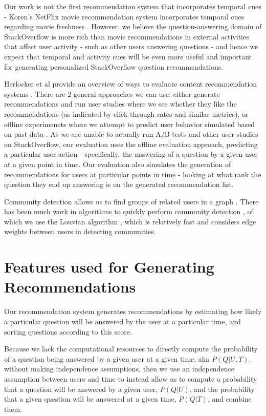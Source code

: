 \documentclass[a4paper]{article}
\begin{document}
Our work is not the first recommendation system that incorporates temporal cues - Koren's NetFlix movie recommendation system incorporates temporal cues regarding movie freshness \cite{koren2010}. However, we believe the question-answering domain of StackOverflow is more rich than movie recommendations in external activities that affect user activity - such as other users answering questions - and hence we expect that temporal and activity cues will be even more useful and important for generating personalized StackOverflow question recommendations.

Herlocker et al provide an overview of ways to evaluate content recommendation systems \cite{herlocker2004}. There are 2 general approaches we can use: either generate recommendations and run user studies where we see whether they like the recommendations (as indicated by click-through rates and similar metrics), or offline experimenets where we attempt to predict user behavior simulated based on past data \cite{zaier2008}. As we are unable to actually run A/B tests and other user studies on StackOverflow, our evaluation uses the offline evaluation approach, predicting a particular user action - specifically, the answering of a question by a given user at a given point in time. Our evaluation also simulates the generation of recommendations for users at particular points in time - looking at what rank the question they end up answering is on the generated recommendation list.

Community detection allows us to find groups of related users in a graph \cite{fortunato2010community}. There has been much work in algorithms to quickly perform community detection \cite{communitybenchmarks}, of which we use the Louvian algorithm \cite{louvian}, which is relatively fast and considers edge weights between users in detecting communities.

\section{Features used for Generating Recommendations}

Our recommendation system generates recommendations by estimating how likely a particular question will be answered by the user at a particular time, and sorting questions according to this score.

Because we lack the computational resources to directly compute the probability of a question being answered by a given user at a given time, aka $P(Q|U,T)$, without making independence assumptions, then we use an independence assumption between users and time to instead allow us to compute a probability that a question will be answered by a given user, $P(Q|U)$, and the probability that a given question will be answered at a given time, $P(Q|T)$, and combine them.
\end{document}
